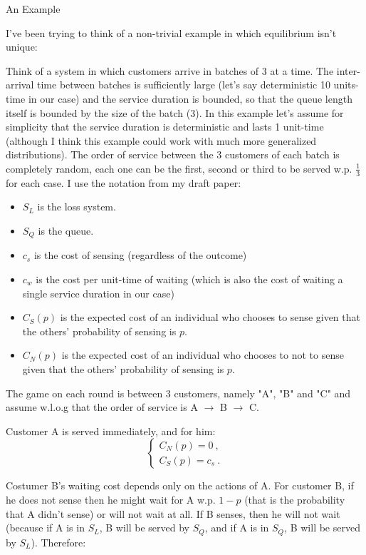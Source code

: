 \documentclass[10pt,a4paper]{article}
\begin{document}
\begin{section}{An Example}

I've been trying to think of a non-trivial example in which equilibrium isn't unique: \bigskip

Think of a system in which customers arrive in batches of 3 at a time. The inter-arrival time between batches is sufficiently large (let's say deterministic 10 units-time in our case) and the service duration is bounded, so that the queue length itself is bounded by the size of the batch (3). In this example let's assume for simplicity that the service duration is deterministic and lasts 1 unit-time (although I think this example could work with much more generalized distributions). The order of service between the 3 customers of each batch is completely random, each one can be the first, second or third to be served w.p. $\frac{1}{3}$ for each case. I use the notation from my draft paper:

\begin{itemize}
\item $S_L$ is the loss system.
\item $S_Q$ is the queue.
\item $c_s$ is the cost of sensing (regardless of the outcome)
\item $c_w$ is the cost per unit-time of waiting (which is also the cost of waiting a single service duration in our case)
\item $C_{S}(p)$ is the expected cost of an individual who chooses to sense given that the others' probability of sensing is $p$.
\item $C_{N}(p)$ is the expected cost of an individual who chooses to not to sense given that the others' probability of sensing is $p$.
\end{itemize}

The game on each round is between 3 customers, namely "A", "B" and "C" and assume w.l.o.g that the order of service is A $\rightarrow$ B $\rightarrow$ C. \bigskip

Customer A is served immediately, and for him:
\begin{equation}\begin{cases}
 	C_{N}(p) = 0 \:, \\
	C_{S}(p) = c_{s} \:.
\end{cases}
\end{equation}

Costumer B's waiting cost depends only on the actions of A. For customer B, if he does not sense then he might wait for A w.p. $1-p$ (that is the probability that A didn't sense) or will not wait at all.
If B senses, then he will not wait (because if A is in $S_L$, B will be served by $S_Q$, and if A is in $S_Q$, B will be served by $S_L$). Therefore:


\end{section}
\end{document}

